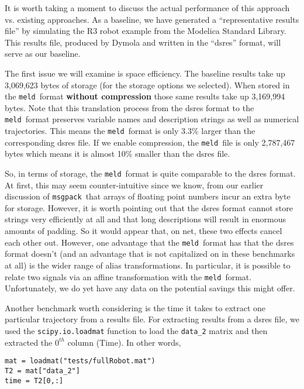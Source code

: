 \documentclass[11pt,a4paper,twocolumn]{article}
\newcommand{\meld}{\texttt{meld}}
\newcommand{\msgpack}{\texttt{msgpack}}
\newcommand{\code}[1]{\texttt{#1}} %
\begin{document}
It is worth taking a moment to discuss the actual performance of this
approach vs. existing approaches.  As a baseline, we have generated a
``representative results file'' by simulating the R3 robot example
from the Modelica Standard Library.  This results file, produced by
Dymola and written in the ``dsres'' format, will serve as our
baseline.


The first issue we will examine is space efficiency.  The baseline
results take up 3,069,623 bytes of storage (for the storage options we
selected).  When stored in the \meld\ format \textbf{without compression}
those same results take up 3,169,994 bytes.  Note that this
translation process from the dsres format to the \meld\ format
preserves variable names and description strings as well as numerical
trajectories.  This means the \meld\ format is only 3.3\% larger than
the corresponding dsres file.  If we enable compression, the
\meld\ file is only 2,787,467 bytes which means it is almost 10\%
smaller than the dsres file.

So, in terms of storage, the \meld\ format is quite comparable to the
dsres format.  At first, this may seem counter-intuitive since we
know, from our earlier discussion of \msgpack\ that arrays of floating
point numbers incur an extra byte for storage.  However, it is worth
pointing out that the dsres format cannot store strings very
efficiently at all and that long descriptions will result in enormous
amounts of padding.  So it would appear that, on net, these two
effects cancel each other out.  However, one advantage that the
\meld\ format has that the dsres format doesn't (and an advantage that
is not capitalized on in these benchmarks at all) is the wider range
of alias transformations.  In particular, it is possible to relate two
signals via an affine transformation with the \meld\ format.
Unfortunately, we do yet have any data on the potential savings this
might offer.


Another benchmark worth considering is the time it takes to extract
one particular trajectory from a results file.  For extracting results
from a dsres file, we used the \code{scipy.io.loadmat} function to
load the \code{data\_2} matrix and then extracted the $0^{th}$ column
(Time).  In other words,

\begin{verbatim}
mat = loadmat("tests/fullRobot.mat")
T2 = mat["data_2"]
time = T2[0,:]
\end{verbatim}
\end{document}

